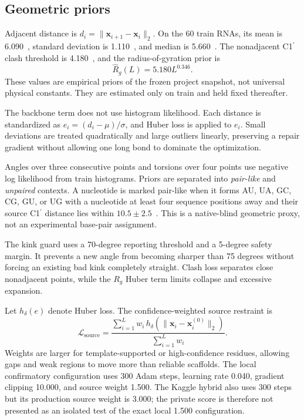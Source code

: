 \documentclass[12pt,a4paper,oneside]{report}
\newcommand{\cprime}{C1$^{\prime}$}
\newcommand{\angstrom}{\text{\AA}}
\begin{document}
\subsection{Geometric priors}

Adjacent distance is $d_i=\lVert\mathbf{x}_{i+1}-\mathbf{x}_i\rVert_2$. On the 60 train
RNAs, its mean is 6.090~\angstrom{}, standard deviation is 1.110~\angstrom{}, and median
is 5.660~\angstrom{}. The nonadjacent \cprime{} clash threshold is 4.180~\angstrom{}, and
the radius-of-gyration prior is
\begin{equation}
\widehat R_g(L)=5.180L^{0.346}.
\end{equation}
These values are empirical priors of the frozen project snapshot, not universal physical
constants. They are estimated only on train and held fixed thereafter.

The backbone term does not use histogram likelihood. Each distance is standardized as
$e_i=(d_i-\mu)/\sigma$, and Huber loss is applied to $e_i$. Small deviations are treated
quadratically and large outliers linearly, preserving a repair gradient without allowing
one long bond to dominate the optimization.

Angles over three consecutive points and torsions over four points use negative log
likelihood from train histograms. Priors are separated into \emph{pair-like} and
\emph{unpaired} contexts. A nucleotide is marked pair-like when it forms AU, UA, GC, CG,
GU, or UG with a nucleotide at least four sequence positions away and their source
\cprime{} distance lies within $10.5\pm2.5$~\angstrom{}. This is a native-blind geometric
proxy, not an experimental base-pair assignment.

The kink guard uses a 70-degree reporting threshold and a 5-degree safety margin. It
prevents a new angle from becoming sharper than 75 degrees without forcing an existing
bad kink completely straight. Clash loss separates close nonadjacent points, while the
$R_g$ Huber term limits collapse and excessive expansion.

Let $h_\delta(e)$ denote Huber loss. The confidence-weighted source restraint is
\begin{equation}
\mathcal{L}_{\mathrm{source}}=
\frac{\sum_{i=1}^{L}w_i\,
h_\delta\!\left(\lVert\mathbf{x}_i-\mathbf{x}^{(0)}_i\rVert_2\right)}
{\sum_{i=1}^{L}w_i}.
\end{equation}
Weights are larger for template-supported or high-confidence residues, allowing gaps and
weak regions to move more than reliable scaffolds. The local confirmatory configuration
uses 300 Adam steps, learning rate 0.040, gradient clipping 10.000, and source weight
1.500. The Kaggle hybrid also uses 300 steps but its production source weight is 3.000;
the private score is therefore not presented as an isolated test of the exact local
1.500 configuration.
\end{document}
